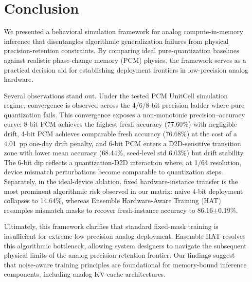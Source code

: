 \section{Conclusion}
\label{sec:conclusion}

We presented a behavioral simulation framework for analog compute-in-memory inference that disentangles algorithmic generalization failures from physical precision-retention constraints. By comparing ideal pure-quantization baselines against realistic phase-change memory (PCM) physics, the framework serves as a practical decision aid for establishing deployment frontiers in low-precision analog hardware.

Several observations stand out. Under the tested PCM UnitCell simulation regime, convergence is observed across the 4/6/8-bit precision ladder where pure quantization fails. This convergence exposes a non-monotonic precision--accuracy curve: 8-bit PCM achieves the highest fresh accuracy (77.60\%) with negligible drift, 4-bit PCM achieves comparable fresh accuracy (76.68\%) at the cost of a 4.01~pp one-day drift penalty, and 6-bit PCM enters a D2D-sensitive transition zone with lower mean accuracy (68.44\%, seed-level std 6.03\%) but drift stability. The 6-bit dip reflects a quantization-D2D interaction where, at 1/64 resolution, device mismatch perturbations become comparable to quantization steps. Separately, in the ideal-device ablation, fixed hardware-instance transfer is the most prominent algorithmic risk observed in our matrix: naive 4-bit deployment collapses to 14.64\%, whereas Ensemble Hardware-Aware Training (HAT) resamples mismatch masks to recover fresh-instance accuracy to 86.16$\pm$0.19\%.

Ultimately, this framework clarifies that standard fixed-mask training is insufficient for extreme low-precision analog deployment. Ensemble HAT resolves this algorithmic bottleneck, allowing system designers to navigate the subsequent physical limits of the analog precision-retention frontier. Our findings suggest that noise-aware training principles are foundational for memory-bound inference components, including analog KV-cache architectures.
